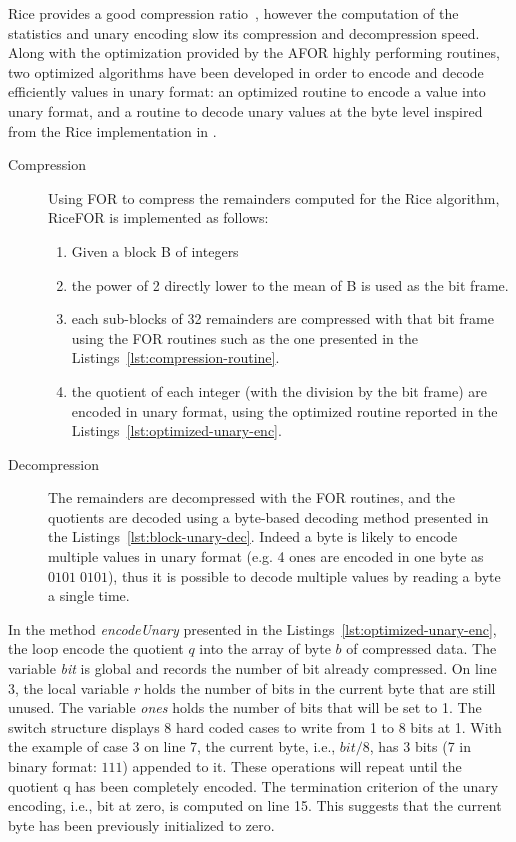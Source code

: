 Rice provides a good compression ratio~\cite{zhang:2008:www}, however the
computation of the statistics and unary encoding slow its compression and
decompression speed. Along with the optimization provided by the AFOR highly
performing routines, two optimized algorithms have been developed in order to
encode and decode efficiently values in unary format: an optimized routine to
encode a value into unary format, and a routine to decode unary values at the
byte level inspired from the Rice implementation in \cite{Yan:2009:sigir}.

\begin{description}
\item[Compression]
Using FOR to compress the remainders computed for the Rice
algorithm, RiceFOR is implemented as follows:
\begin{enumerate}
  \item[] Given a block B of integers
  \item the power of 2 directly lower to the mean of B is used as the bit frame.
  \item each sub-blocks of 32 remainders are compressed with that bit frame
  using the FOR routines such as the one presented in the
  Listings~\ref{lst:compression-routine}.
  \item the quotient of each integer (with the division by the bit frame) are
  encoded in unary format, using the optimized routine reported in the
  Listings~\ref{lst:optimized-unary-enc}.
\end{enumerate}
\item[Decompression] The remainders are decompressed with the
FOR routines, and the quotients are decoded using a byte-based decoding method
presented in the Listings~\ref{lst:block-unary-dec}. Indeed a byte is likely to
encode multiple values in unary format (e.g. 4 ones are encoded in one byte as
$0101\;0101$), thus it is possible to decode multiple values by reading a byte
a single time.
\end{description}

In the method \emph{encodeUnary} presented in the
Listings~\ref{lst:optimized-unary-enc}, the loop encode the quotient $q$ into
the array of byte $b$ of compressed data. The variable \emph{bit} is global and
records the number of bit already compressed. On line 3, the local variable
\emph{r} holds the number of bits in the current byte that are still unused.
The variable \emph{ones} holds the number of bits that will be set to 1. The
switch structure displays 8 hard coded cases to write from 1 to 8 bits at 1.
With the example of case 3 on line 7, the current byte, i.e., $bit / 8$, has
3 bits (7 in binary format: $111$) appended to it. These operations will repeat
until the quotient q has been completely encoded. The termination criterion of
the unary encoding, i.e., bit at zero, is computed on line 15. This suggests
that the current byte has been previously initialized to zero.

